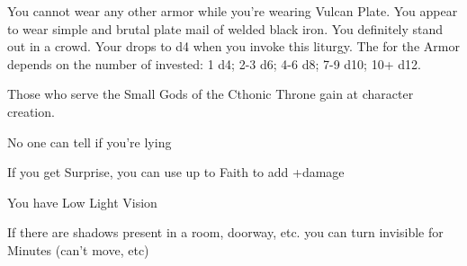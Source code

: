 {You cannot wear any other armor while you're wearing Vulcan Plate.  You appear to wear simple and brutal plate mail of welded black iron.  You definitely stand out in a crowd.  Your \MD drops to d4 when you invoke this liturgy.  The \UD for the Armor depends on the number of \DICE invested: 1 d4; 2-3 d6; 4-6 d8; 7-9 d10; 10+ d12.

\newpage





Those who serve the Small Gods of the Cthonic Throne gain \DCUP \DEX at character creation.





\GOD[
Name=Arioch,
Link=small-god-arioch,
GodOf=Fiend of Murder and Betrayal,
Holy=a silver coin with a face on each side
]


No one can tell if you're lying


If you get Surprise, you can use up to \LVL Faith to add +\SUMDICE damage





\GOD[
Name=Erebus,
Link=small-god-erebus,
GodOf=Lord of Shadows,
Holy=a piece of black gauze covering the mouth
]


You have Low Light Vision


If there are shadows present in a room, doorway, etc. you can turn invisible for \SUMDICE Minutes (can't move, etc)




\GOD[
Name=Ik'tik'buboe,
Link=small-god-ik'tik'buboe,
GodOf=The Drowned Sultan,
Holy=a necklace made from crab's claws and nautical rope tied in elaborate knots
]

}
